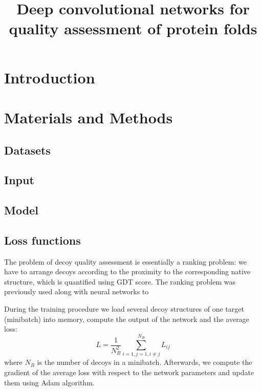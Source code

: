 \documentclass[letter,10pt]{article}
\title{Deep convolutional networks for quality assessment of protein folds}
\author{}
\begin{document}
\maketitle

\begin{abstract}

\end{abstract}

\section{Introduction}


\section{Materials and Methods}

\subsection{Datasets}


\subsection{Input}


\subsection{Model}


\subsection{Loss functions}

The problem of decoy quality assessment is essentially a ranking problem: we have to arrange decoys according to 
the proximity to the corresponding native structure, which is quantified using GDT score. The ranking problem 
was previously used along with neural networks to 

During the training procedure we load several decoy structures of one target (minibatch) into memory, compute the 
output of the network and the average loss:
$$ L = \frac{1}{N^{2}_B} \sum_{i=1,j=1, i \neq j}^{N_B} L_{ij} $$ 
where $N_B$ is the number of decoys in a minibatch. Afterwards, we compute the gradient of the average loss with respect 
to the network parameters and update them using Adam algorithm.
\end{document}
